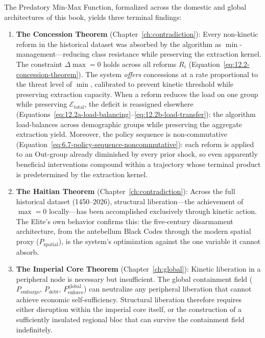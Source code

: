 The Predatory Min-Max Function, formalized across the domestic and global architectures of this book, yields three terminal findings:

\begin{enumerate}
    \item \textbf{The Concession Theorem} (Chapter~\ref{ch:contradiction}): Every non-kinetic reform in the historical dataset was absorbed by the algorithm as $\min$-management---reducing class resistance while preserving the extraction kernel. The constraint $\Delta\max = 0$ holds across all reforms $R_i$ (Equation~\ref{eq:12.2-concession-theorem}). The system \textit{offers} concessions at a rate proportional to the threat level of $\min$, calibrated to prevent kinetic threshold while preserving extraction capacity. When a reform reduces the load on one group while preserving $\mathcal{E}_{\text{total}}$, the deficit is reassigned elsewhere (Equations~\ref{eq:12.2a-load-balancing}--\ref{eq:12.2b-load-transfer}): the algorithm load-balances across demographic groups while preserving the aggregate extraction yield. Moreover, the policy sequence is non-commutative (Equation~\ref{eq:6.7-policy-sequence-noncommutative}): each reform is applied to an Out-group already diminished by every prior shock, so even apparently beneficial interventions compound within a trajectory whose terminal product is predetermined by the extraction kernel.

    \item \textbf{The Haitian Theorem} (Chapter~\ref{ch:contradiction}): Across the full historical dataset (1450--2026), structural liberation---the achievement of $\max = 0$ locally---has been accomplished exclusively through kinetic action. The Elite's own behavior confirms this: the five-century disarmament architecture, from the antebellum Black Codes through the modern spatial proxy ($P_{\text{spatial}}$), is the system's optimization against the one variable it cannot absorb.

    \item \textbf{The Imperial Core Theorem} (Chapter~\ref{ch:global}): Kinetic liberation in a peripheral node is necessary but insufficient. The global containment field ($P_{\text{embargo}}$, $P_{\text{debt}}$, $F_{\text{enforce}}^{\text{global}}$) can neutralize any peripheral liberation that cannot achieve economic self-sufficiency. Structural liberation therefore requires either disruption within the imperial core itself, or the construction of a sufficiently insulated regional bloc that can survive the containment field indefinitely.
\end{enumerate}

